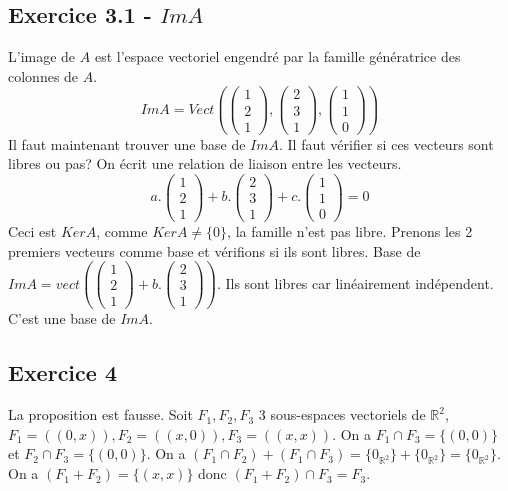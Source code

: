 \documentclass[]{book}
\theoremstyle{definition}
\newcommand{\bb}[1]{\mathbb{#1}}
\newcommand{\R}{\bb{R}}
\begin{document}
\subsection*{Exercice 3.1 - $Im A$}
L'image de $A$ est l'espace vectoriel engendr\'e par la famille g\'en\'eratrice des colonnes de $A$.
$$Im A =  Vect(\begin{pmatrix} 1 \\ 2 \\ 1 \end{pmatrix},\begin{pmatrix} 2 \\ 3 \\ 1 \end{pmatrix},\begin{pmatrix} 1 \\ 1 \\ 0 \end{pmatrix})$$
Il faut maintenant trouver une base de $Im A$.
Il faut v\'erifier si ces vecteurs sont libres ou pas? On \'ecrit une relation de liaison entre les vecteurs.
$$a.\begin{pmatrix}1\\2\\1\end{pmatrix} + b.\begin{pmatrix}2\\3\\1\end{pmatrix} + c.\begin{pmatrix}1\\1\\0\end{pmatrix} = 0$$
Ceci est $Ker A$, comme $Ker A \neq \{0\}$, la famille n'est pas libre. Prenons les 2 premiers vecteurs comme base et v\'erifions si ils sont libres.
Base de $Im A = vect(\begin{pmatrix}1\\2\\1\end{pmatrix} + b.\begin{pmatrix}2\\3\\1\end{pmatrix})$. Ils sont libres car lin\'eairement ind\'ependent. C'est une base de $Im A$.



\subsection*{Exercice 4}
La proposition est fausse. Soit $F_1,F_2,F_3$ 3 sous-espaces vectoriels de $\R^2$, $F_1=((0,x)), F_2=((x,0)), F_3=((x,x))$. On a $F_1 \cap F_3 = \{(0,0)\}$ et $F_2 \cap F_3 = \{(0,0)\}$. On a $(F_1 \cap F_2) + (F_1 \cap F_3) = \{0_{\R^2}\} + \{0_{\R^2}\} = \{0_{\R^2}\}$. On a $(F_1 + F_2) = \{(x,x)\}$ donc $(F_1 + F_2) \cap F_3 = F_3$.
\end{document}
